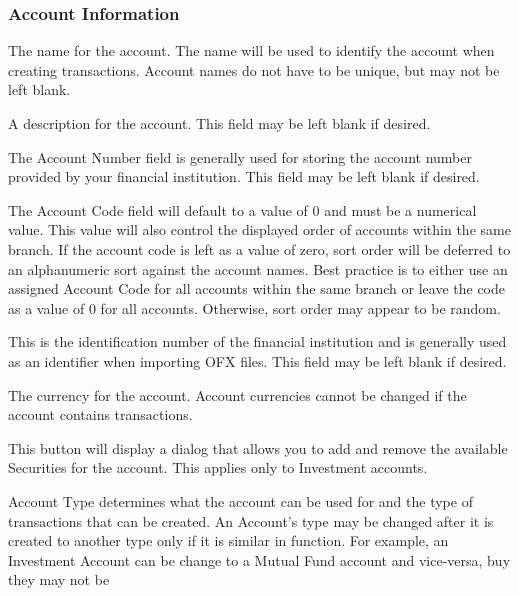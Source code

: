 \documentclass[letterpaper,12pt]{book}
\begin{document}
    \subsubsection*{Account Information}
    \begin{description}[style=nextline]
        \item[Name]
        The name for the account.
        The name will be used to identify the account when creating transactions.
        Account names do not have to be unique, but may not be left blank.
        \item[Description]
        A description for the account.
        This field may be left blank if desired.
        \item[Account Number]
        The Account Number field is generally used for storing the account number provided by your financial institution.
        This field may be left blank if desired.
        \item[Account Code (General Ledger Code)]
        The Account Code field will default to a value of 0 and must be a numerical value.
        This value will also control the displayed order of accounts within the same branch.
        If the account code is left as a value of zero, sort order will be deferred to an alphanumeric sort against the account names.
        Best practice is to either use an assigned Account Code for all accounts within the same branch or leave the
        code as a value of 0 for all accounts.
        Otherwise, sort order may appear to be random.
        \item[Bank ID]
        This is the identification number of the financial institution and is generally used as an identifier when importing OFX files.
        This field may be left blank if desired.
        \item[Currency]
        The currency for the account.
        Account currencies cannot be changed if the account contains transactions.
        \item[Securities]
        This button will display a dialog that allows you to add and remove the available Securities for the account.
        This applies only to Investment accounts.
        \item[Account Type]
        Account Type determines what the account can be used for and the type of transactions that can be created.
        An Account's type may be changed after it is created to another type only if it is similar in function.
        For example, an Investment Account can be change to a Mutual Fund account and vice-versa, buy they may not be

\end{description}
\end{document}
